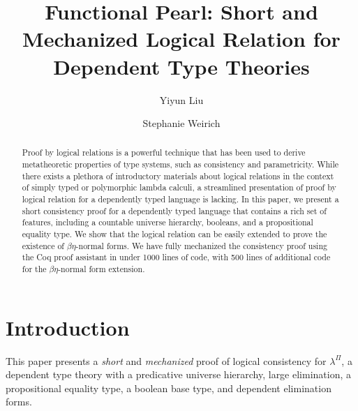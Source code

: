 \documentclass[\ifpublic nolinenum\else\fi,online,OA]{jfp}
\newcommand{\lang}{$\lambda^{\Pi}$\xspace}
\theoremstyle{definition}
\begin{document}
\totalpg{\pageref{lastpage}}

\title{Functional Pearl: Short and Mechanized Logical Relation for Dependent Type Theories}

\begin{authgrp}
\author{Yiyun Liu}


\author{Stephanie Weirich}
\end{authgrp}

\begin{abstract}
Proof by logical relations is a powerful technique that has been used
to derive metatheoretic properties of type systems, such as
consistency and parametricity. While there exists a
plethora of introductory materials about logical relations in the
context of simply typed or polymorphic lambda calculi, a streamlined
presentation of proof by logical relation for a dependently typed language
is lacking. In this paper, we present a short
consistency proof for a dependently typed language that contains a
rich set of features, including a countable universe
hierarchy, booleans, and a propositional equality type. We show that
the logical relation can be easily extended to prove the existence of
$\beta\eta$-normal forms.
We have
fully mechanized the consistency proof using the Coq proof assistant
in under 1000 lines of code, with 500 lines of additional code for the
$\beta\eta$-normal form extension.
\end{abstract}

\maketitle[T]

\section{Introduction}
This paper presents a \emph{short} and \emph{mechanized} proof of
logical consistency for \lang{}, a dependent type theory with a
predicative universe hierarchy, large elimination, a propositional equality
type, a boolean base type, and dependent elimination forms.
\end{document}
